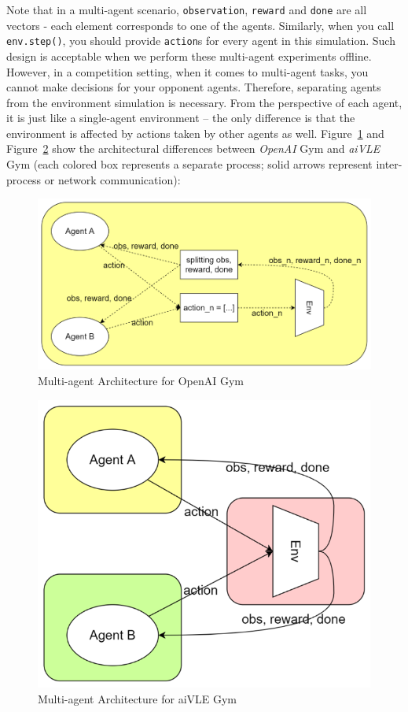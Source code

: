Note that in a multi-agent scenario, \texttt{observation}, \texttt{reward} and \texttt{done} are all vectors - each element corresponds to one of the agents. Similarly, when you call \texttt{env.step()}, you should provide \texttt{action}s for every agent in this simulation. Such design is acceptable when we perform these multi-agent experiments offline. However, in a competition setting, when it comes to multi-agent tasks, you cannot make decisions for your opponent agents. Therefore, separating agents from the environment simulation is necessary. From the perspective of each agent, it is just like a single-agent environment – the only difference is that the environment is affected by actions taken by other agents as well. Figure~\ref{fig:opanai-gym-multi-arch} and Figure~\ref{fig:aivle-gym-multi-arch} show the architectural differences between \emph{OpenAI} Gym and \emph{aiVLE} Gym (each colored box represents a separate process; solid arrows represent inter-process or network communication):
\begin{figure}[H]
    \centering
    \includegraphics{images/opanai-gym-multi-arch.png}
    \caption{Multi-agent Architecture for OpenAI Gym}
    \label{fig:opanai-gym-multi-arch}
\end{figure}
\begin{figure}[H]
    \centering
    \includegraphics{images/aivle-gym-multi-arch.png}
    \caption{Multi-agent Architecture for aiVLE Gym}
    \label{fig:aivle-gym-multi-arch}
\end{figure}

